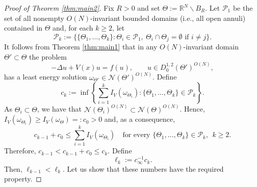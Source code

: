\documentclass[10pt,letterpaper]{article}
\numberwithin{equation}{section}
\def\R{\mathbb{R}}
\def\cN{\mathcal{N}}
\begin{document}
\begin{proof}[Proof of Theorem \ref{thm:main2}]
Fix $R>0$ and set $\Theta := \R^N \smallsetminus B_R$. Let $\mathcal{P}_1$ be the set of all nonempty $O(N)$-invariant bounded domains (i.e., all open annuli) contained in $\Theta$ and, for each $k\geq 2$, let
\[
\mathcal{P}_k:=  \big\lbrace \{\Theta_1, \ldots, \Theta_k\}: \Theta_i \in \mathcal{P}_1, \ \Theta_i \cap \Theta_j = \emptyset  \text{ if } i \neq j \big\rbrace .
	\]
It follows from Theorem \ref{thm:main1} that in any $O(N)$-invariant domain $\Theta'\subset\Theta$ the problem
	\[
	 - \Delta u + V(x)u = f(u), \qquad u \in D^{1,2}_0(\Theta')^{O(N)},
	\] 
has a least energy solution $\omega_{\Theta'} \in \mathcal{N}(\Theta')^{O(N)} $. Define
	\[
	c_k:= \inf\left\lbrace \sum_{i=1}^{k}  I_V(\omega_{\Theta_i}): \{\Theta_1, \ldots , \Theta_k\} \in \mathcal{P}_k \right\rbrace.
	\]
As $\Theta_i \subset\Theta$, we have that $\cN(\Theta_i)^{O(N)}\subset\cN(\Theta)^{O(N)}$. Hence, $I_V(\omega_{\Theta_i})\geq I_V(\omega_\Theta)=:c_0>0$ and, as a consequence,
	\[
	c_{k-1} + c_0\leq \sum_{i=1}^{k} I_V(\omega_{\Theta_i})\quad\text{for every \ }\{\Theta_1, \ldots, \Theta_k\} \in \mathcal{P}_k, \ \ k \geq 2.
	\]
Therefore, $c_{k-1}<c_{k-1}+ c_0 \leq c_k$. Define
\begin{equation}\label{eq:ell}
\ell_k := c_{\infty}^{-1}c_k.
\end{equation}
Then, $\ell_{k-1}<\ell_k$. Let us show that these numbers have the required property.


\end{proof}
\end{document}
